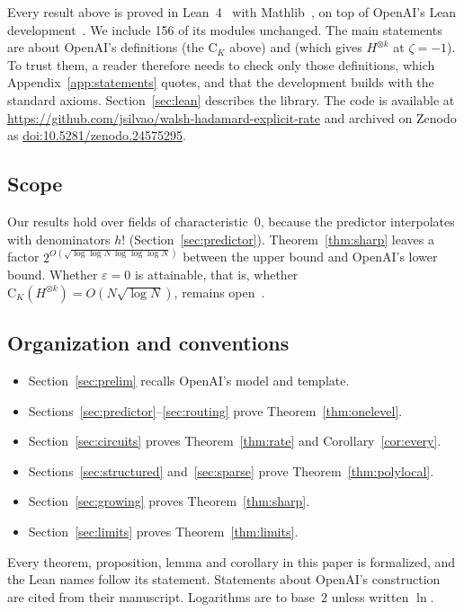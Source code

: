 \documentclass[acmsmall,nonacm,screen]{acmart}
\newcommand{\lean}[1]{\textup{\texttt{\detokenize{#1}}}}
\newcommand{\cost}{\mathrm{C}}
\newcommand{\repourl}{\url{https://github.com/jsilvao/walsh-hadamard-explicit-rate}}
\begin{document}
Every result above is proved in Lean~4~\cite{Lean4} with Mathlib~\cite{mathlib}, on top of OpenAI's Lean development~\cite{oaimath}. We include 156 of its modules unchanged. The main statements are about OpenAI's definitions \lean{complexity} (the $\cost_K$ above) and \lean{primeTransform} (which gives $H^{\otimes k}$ at $\zeta=-1$). To trust them, a reader therefore needs to check only those definitions, which Appendix~\ref{app:statements} quotes, and that the development builds with the standard axioms. Section~\ref{sec:lean} describes the library. The code is available at \repourl{} and archived on Zenodo as \href{https://doi.org/10.5281/zenodo.24575295}{doi:10.5281/zenodo.24575295}.

\subsection{Scope}

Our results hold over fields of characteristic~$0$, because the predictor interpolates with denominators $h!$ (Section~\ref{sec:predictor}). Theorem~\ref{thm:sharp} leaves a factor $2^{O(\sqrt{\log\log N\,\log\log\log N})}$ between the upper bound and OpenAI's lower bound. Whether $\varepsilon=0$ is attainable, that is, whether $\cost_K(H^{\otimes k})=O(N\sqrt{\log N})$, remains open~\cite[p.~2]{oai2026}.

\subsection{Organization and conventions}

\begin{itemize}
\item Section~\ref{sec:prelim} recalls OpenAI's model and template.
\item Sections~\ref{sec:predictor}--\ref{sec:routing} prove Theorem~\ref{thm:onelevel}.
\item Section~\ref{sec:circuits} proves Theorem~\ref{thm:rate} and Corollary~\ref{cor:every}.
\item Sections~\ref{sec:structured} and~\ref{sec:sparse} prove Theorem~\ref{thm:polylocal}.
\item Section~\ref{sec:growing} proves Theorem~\ref{thm:sharp}.
\item Section~\ref{sec:limits} proves Theorem~\ref{thm:limits}.
\end{itemize}

Every theorem, proposition, lemma and corollary in this paper is formalized, and the Lean names follow its statement. Statements about OpenAI's construction are cited from their manuscript. Logarithms are to base~$2$ unless written $\ln$.
\end{document}
